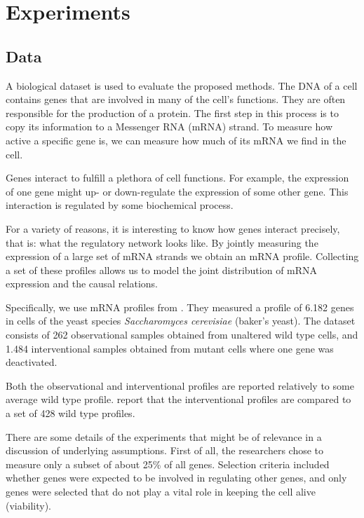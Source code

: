 \section*{Experiments}

\subsection*{Data}
A biological dataset is used to evaluate the proposed methods. The DNA of a cell contains genes that are involved in many of the cell's functions. They are often responsible for the production of a protein. The first step in this process is to copy its information to a Messenger RNA (mRNA) strand. To measure how active a specific gene is, we can measure how much of its mRNA we find in the cell.

Genes interact to fulfill a plethora of cell functions. For example, the expression of one gene might up- or down-regulate the expression of some other gene. This interaction is regulated by some biochemical process. 

For a variety of reasons, it is interesting to know how genes interact precisely, that is: what the regulatory network looks like. By jointly measuring the expression of a large set of mRNA strands we obtain an mRNA profile. Collecting a set of these profiles allows us to model the joint distribution of mRNA expression and the causal relations.

Specifically, we use mRNA profiles from \citeauthor{kemmeren2014large}. They measured a profile of 6.182 genes in cells of the yeast species \textit{Saccharomyces cerevisiae} (baker's yeast). The dataset consists of 262 observational samples obtained from unaltered wild type cells, and 1.484 interventional samples obtained from mutant cells where one gene was deactivated.

Both the observational and interventional profiles are reported relatively to some average wild type profile. \citeauthor{kemmeren2014large} report that the interventional profiles are compared to a set of 428 wild type profiles.   

There are some details of the experiments that might be of relevance in a discussion of underlying assumptions. First of all, the researchers chose to measure only a subset of about 25\% of all genes. Selection criteria included whether genes were expected to be involved in regulating other genes, and only genes were selected that do not play a vital role in keeping the cell alive (viability).

